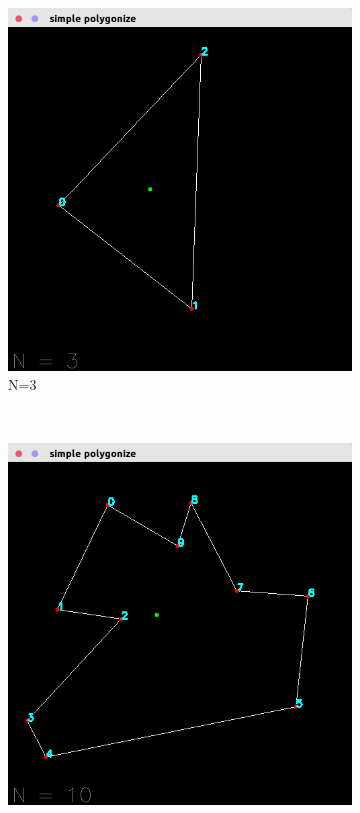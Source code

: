 \documentclass[a4paper, 12pt]{report}
\begin{document}
\begin{figure}[h]
\begin{subfigure}[t]{0.4\textwidth}
        \includegraphics[width=\textwidth]{1-n3}
        \caption{N=3}
    \end{subfigure}%
    \\
    \begin{subfigure}[t]{0.4\textwidth}
    	\centering
    	\includegraphics[width=\textwidth]{2-n10}

\end{subfigure}
\end{figure}
\end{document}
